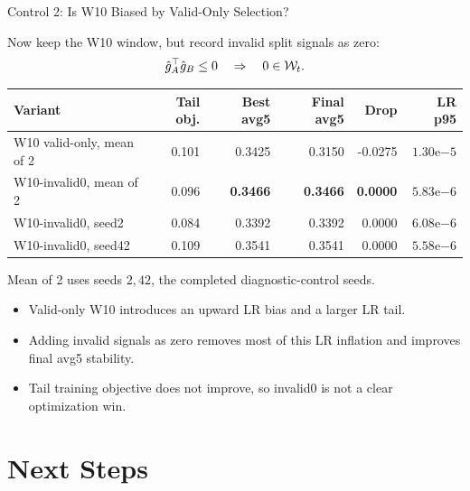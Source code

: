\documentclass[aspectratio=169]{beamer}
\begin{document}
\begin{frame}{Control 2: Is W10 Biased by Valid-Only Selection?}
\small

Now keep the W10 window, but record invalid split signals as zero:
\[
  \hat g_A^\top \hat g_B \le 0
  \quad\Rightarrow\quad
  0 \in {\cal W}_t .
\]


\begin{center}
\scriptsize
\begin{tabular}{lrrrrr}
\toprule
Variant & Tail obj. & Best avg5 & Final avg5 & Drop & LR p95 \\
\midrule
W10 valid-only, mean of 2 & 0.101 & 0.3425 & 0.3150 & -0.0275 & \(1.30\mathrm{e}{-5}\) \\
W10-invalid0, mean of 2 & 0.096 & \textbf{0.3466} & \textbf{0.3466} & \textbf{0.0000} & \(5.83\mathrm{e}{-6}\) \\
\midrule
W10-invalid0, seed2 & 0.084 & 0.3392 & 0.3392 & 0.0000 & \(6.08\mathrm{e}{-6}\) \\
W10-invalid0, seed42 & 0.109 & 0.3541 & 0.3541 & 0.0000 & \(5.58\mathrm{e}{-6}\) \\
\bottomrule
\end{tabular}
\end{center}


{\footnotesize\color{Muted}
Mean of 2 uses seeds \(2,42\), the completed diagnostic-control seeds.
}

\begin{itemize}
  \item Valid-only W10 introduces an upward LR bias and a larger LR tail.
  \item Adding invalid signals as zero removes most of this LR inflation and improves final avg5 stability.
  \item Tail training objective does not improve, so invalid0 is not a clear optimization win.
\end{itemize}

\end{frame}





\section{Next Steps}
\end{document}
